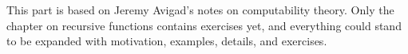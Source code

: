 \documentclass[../../include/open-logic-part]{subfiles}
\begin{document}

\begin{editorial}
  This part is based on Jeremy Avigad's notes on computability
  theory. Only the chapter on recursive functions contains exercises
  yet, and everything could stand to be expanded with motivation,
  examples, details, and exercises.
\end{editorial}



\OLEndPartHook
\end{document}
